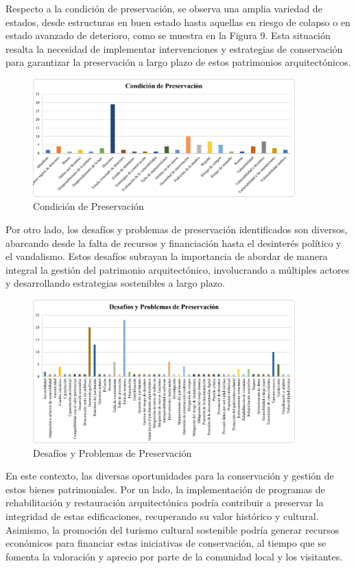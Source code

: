 \documentclass[journal,article,submit,pdftex,moreauthors]{Definitions/mdpi}
\begin{document}
Respecto a la condición de preservación, se observa una amplia variedad de estados, desde estructuras en buen estado hasta aquellas en riesgo de colapso o en estado avanzado de deterioro, como se muestra en la Figura 9. Esta situación resalta la necesidad de implementar intervenciones y estrategias de conservación para garantizar la preservación a largo plazo de estos patrimonios arquitectónicos.
 \par %
  \begin{figure} [h!]
    \centering
    \includegraphics[width=0.9\textwidth]{Graficos/Condición de Preservación.png }
    \caption{Condición de Preservación}
    \label{fig:grafico}
\end{figure}
\par %
Por otro lado, los desafíos y problemas de preservación identificados son diversos, abarcando desde la falta de recursos y financiación hasta el desinterés político y el vandalismo. Estos desafíos subrayan la importancia de abordar de manera integral la gestión del patrimonio arquitectónico, involucrando a múltiples actores y desarrollando estrategias sostenibles a largo plazo.
 \par %
  \begin{figure} [h!]
    \centering
    \includegraphics[width=0.9\textwidth]{Graficos/Desafíos y Problemas de Preservación.png }
    \caption{Desafíos y Problemas de Preservación}
    \label{fig:grafico}
\end{figure}
\par %
En este contexto, las diversas oportunidades para la conservación y gestión de estos bienes patrimoniales. Por un lado, la implementación de programas de rehabilitación y restauración arquitectónica podría contribuir a preservar la integridad de estas edificaciones, recuperando su valor histórico y cultural. Asimismo, la promoción del turismo cultural sostenible podría generar recursos económicos para financiar estas iniciativas de conservación, al tiempo que se fomenta la valoración y aprecio por parte de la comunidad local y los visitantes.
\end{document}
